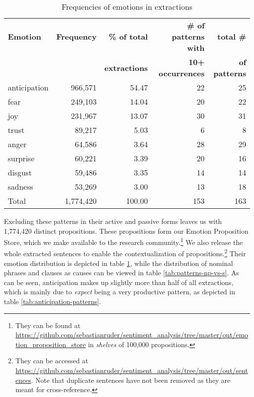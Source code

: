 \begin{table}[h]
\centering
\begin{tabular}{l|r|r|r|r}
{\bf Emotion} & {\bf Frequency} & {\bf\% of total} & {\bf\# of patterns with} & {\bf total \#} \\
& & {\bf extractions} & {\bf 10+ occurrences} & {\bf of patterns}\\\hline
anticipation  & 966,571 & 54.47 & 22 & 25\\
fear          & 249,103 & 14.04 & 20 & 22\\
joy           & 231,967 & 13.07 & 30 & 31\\
trust         & 89,217  & 5.03  &  6 & 8\\
anger         & 64,586  & 3.64  & 28 & 29\\
surprise      & 60,221  & 3.39  & 20 & 16\\
disgust       & 59,486  & 3.35  & 14 & 14\\
sadness       & 53,269  & 3.00  & 13 & 18\\\hline
Total         & 1,774,420 & 100.00 & 153 & 163              
\end{tabular}
\caption{Frequencies of emotions in extractions}
\label{tab:extraction-emotion-freq}
\end{table}

Excluding these patterns in their active and passive forms leaves us with 1,774,420 distinct propositions. These propositions form our Emotion Proposition Store, which we make available to the research community.\footnote{They can be found at \url{https://github.com/sebastianruder/sentiment_analysis/tree/master/out/emotion_proposition_store} in \textit{shelves} of 100,000 propositions.} We also release the whole extracted sentences to enable the contextualization of propositions.\footnote{They can be accessed at \url{https://github.com/sebastianruder/sentiment_analysis/tree/master/out/sentences}. Note that duplicate sentences have not been removed as they are meant for cross-reference.} Their emotion distribution is depicted in table \ref{tab:extraction-emotion-freq}, while the distribution of nominal phrases and clauses as causes can be viewed in table \ref{tab:patterns-np-vs-s}. As can be seen, anticipation makes up slightly more than half of all extractions, which is mainly due to \textit{expect} being a very productive pattern, as depicted in table \ref{tab:anticipation-patterns}.

